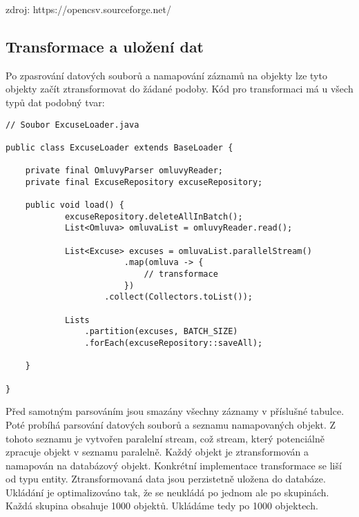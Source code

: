 zdroj: https://opencsv.sourceforge.net/

\subsection{Transformace a uložení dat}
Po zpasrování datových souborů a namapování záznamů na objekty lze tyto objekty začít ztransformovat do žádané podoby. Kód pro transformaci má u všech typů dat podobný tvar:

\begin{lstlisting}[caption={Transformace objektu Omluva na databázový objekt Excuse}, tabsize=2]
// Soubor ExcuseLoader.java
	
public class ExcuseLoader extends BaseLoader {

    private final OmluvyParser omluvyReader;
    private final ExcuseRepository excuseRepository;

    public void load() {
			excuseRepository.deleteAllInBatch();
			List<Omluva> omluvaList = omluvyReader.read();
			
			List<Excuse> excuses = omluvaList.parallelStream()
						.map(omluva -> {
							// transformace
						})
					.collect(Collectors.toList());
				
			Lists
				.partition(excuses, BATCH_SIZE)
				.forEach(excuseRepository::saveAll);

	}

}
\end{lstlisting}

\noindent 
Před samotným parsováním jsou smazány všechny záznamy v příslušné tabulce. Poté probíhá parsování datových souborů a seznamu namapovaných objekt. Z tohoto seznamu je vytvořen paralelní stream, což stream, který potenciálně zpracuje objekt v seznamu paralelně. Každý objekt je ztransformován a namapován na databázový objekt. Konkrétní implementace transformace se liší od typu entity. Ztransformovaná data jsou perzistetně uložena do databáze. Ukládání je optimalizováno tak, že se neukládá po jednom ale po skupinách. Každá skupina obsahuje 1000 objektů. Ukládáme tedy po 1000 objektech.

